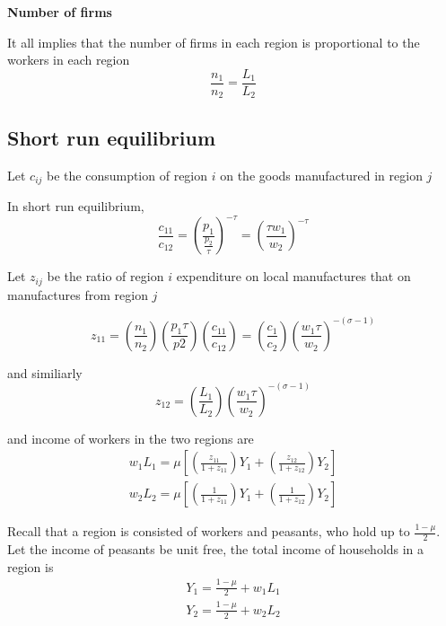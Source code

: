 \documentclass{article}
\numberwithin{equation}{section} %
\begin{document}
\textbf{Number of firms}

It all implies that the number of firms in each region is proportional to the workers in each region
\begin{equation}
  \frac{n_1}{n_2}=\frac{L_1}{L_2}
\end{equation}

\subsection{Short run equilibrium} %
\label{sub:short_run_equilibrium}

Let $c_{ij}$ be the consumption of region $i$ on the goods manufactured in region $j$

In short run equilibrium, 
\begin{equation}
  \frac{c_{11}}{c_{12}}=(\frac{p_1}{\frac{p_2}{\tau}})^{-\tau}=(\frac{\tau w_1}{w_2})^{-\tau}
\end{equation}

Let $z_{ij}$ be the ratio of region $i$ expenditure on local manufactures that on manufactures from region $j$

\begin{equation}
  z_{11}=(\frac{n_1}{n_2})(\frac{p_1 \tau}{p2})(\frac{c_{11}}{c_{12}})=(\frac{c_1}{c_2})(\frac{w_1 \tau}{w_2})^{-(\sigma-1)} \label{z11}
\end{equation}

and similiarly
\begin{equation}
  z_{12}=(\frac{L_1}{L_2})(\frac{w_1 \tau}{w_2})^{-(\sigma-1)}
\end{equation}

and income of workers in the two regions are 
\begin{align}
  w_1 L_1 =\mu[(\frac{z_{11}}{1+z_{11}})Y_1+(\frac{z_{12}}{1+z_{12}})Y_2]
  \\
  w_2 L_2 =\mu[(\frac{1}{1+z_{11}})Y_1+(\frac{1}{1+z_{12}})Y_2]
\end{align}

Recall that a region is consisted of workers and peasants, who hold up to $\frac{1-\mu}{2}$. Let the income of peasants be unit free, the total income of households in a region is 
\begin{align}
Y_1 = \frac{1-\mu}{2}+w_1 L_1 \label{income of region 1}
\\Y_2 = \frac{1-\mu}{2}+w_2 L_2 \label{income of region 2}
\end{align}
\end{document}
